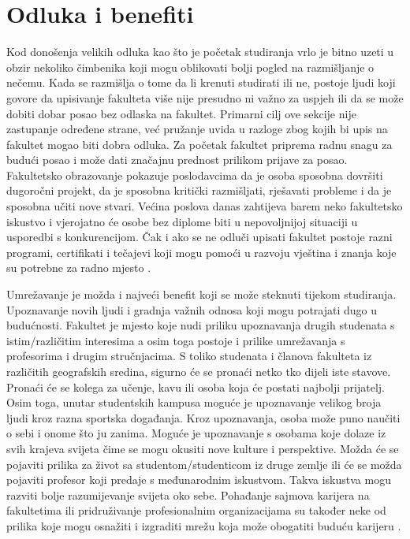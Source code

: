 \documentclass[]{foi}
\begin{document}
\section{Odluka i benefiti}
Kod donošenja velikih odluka kao što je početak studiranja vrlo je bitno uzeti u obzir nekoliko čimbenika koji mogu oblikovati bolji pogled na razmišljanje o nečemu. Kada se razmišlja o tome da li krenuti
studirati ili ne, postoje ljudi koji govore da upisivanje fakulteta više nije presudno ni važno za uspjeh ili da se može dobiti dobar posao bez odlaska na fakultet.
Primarni cilj ove sekcije nije zastupanje određene strane, već pružanje uvida u razloge zbog kojih bi upis na fakultet mogao biti dobra odluka. Za početak fakultet priprema radnu snagu za budući posao i može
dati značajnu prednost prilikom prijave za posao. Fakultetsko obrazovanje pokazuje poslodavcima da je osoba sposobna dovršiti dugoročni projekt, da je sposobna kritički razmišljati,
rješavati probleme i da je sposobna učiti nove stvari. Većina poslova danas zahtijeva barem neko fakultetsko iskustvo i vjerojatno će osobe bez diplome biti u nepovoljnijoj situaciji u usporedbi
s konkurencijom. Čak i ako se ne odluči upisati fakultet postoje razni programi, certifikati i tečajevi koji mogu pomoći u razvoju vještina i znanja koje su potrebne za radno mjesto
\cite{bisio2025college}.

Umrežavanje je možda i najveći benefit koji se može steknuti tijekom studiranja. Upoznavanje novih ljudi i gradnja važnih odnosa koji mogu potrajati dugo u budućnosti. Fakultet je mjesto koje nudi priliku upoznavanja drugih studenata s istim/različitim interesima a osim toga postoje i prilike umrežavanja s profesorima i drugim stručnjacima.
S toliko studenata i članova fakulteta iz različitih geografskih sredina, sigurno će se pronaći netko tko dijeli iste stavove. Pronaći će se kolega za učenje, kavu ili osoba koja će postati najbolji prijatelj.
Osim toga, unutar studentskih kampusa moguće je upoznavanje velikog broja ljudi kroz razna sportska događanja. Kroz upoznavanja, osoba može puno naučiti o sebi i onome što ju zanima.
Moguće je upoznavanje s osobama koje dolaze iz svih krajeva svijeta čime se mogu okusiti nove kulture i perspektive. Možda će se pojaviti prilika za život sa studentom/studenticom iz druge zemlje ili 
će se možda pojaviti profesor koji predaje s međunarodnim iskustvom. Takva iskustva mogu razviti bolje razumijevanje svijeta oko sebe. Pohađanje sajmova karijera na fakultetima ili 
pridruživanje profesionalnim organizacijama su također neke od prilika koje mogu osnažiti i izgraditi mrežu koja može obogatiti buduću karijeru \cite{bisio2025college}.
\end{document}
